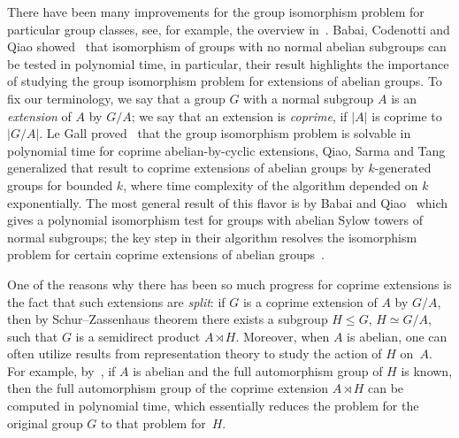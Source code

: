 \documentclass{article}
\begin{document}
There have been many improvements for the group isomorphism problem for particular group classes, see, for example, the overview in~\cite{grochow}.
Babai, Codenotti and Qiao showed~\cite{trivrad} that isomorphism of groups with no normal abelian subgroups can be tested in polynomial time,
in particular, their result highlights the importance of studying the group isomorphism problem for extensions of abelian groups.
To fix our terminology, we say that a group \( G \) with a normal subgroup \( A \) is an \emph{extension} of \( A \) by \( G/A \);
we say that an extension is \emph{coprime}, if \( |A| \) is coprime to \( |G/A| \).
Le Gall proved~\cite{legall} that the group isomorphism problem is solvable in polynomial time for coprime abelian-by-cyclic extensions,
Qiao, Sarma and Tang~\cite{qiao} generalized that result to coprime extensions of abelian groups by \( k \)-generated groups for bounded \( k \),
where time complexity of the algorithm depended on \( k \) exponentially. The most general result of this flavor is by Babai and Qiao~\cite{absyl}
which gives a polynomial isomorphism test for groups with abelian Sylow towers of normal subgroups; the key step in their algorithm
resolves the isomorphism problem for certain coprime extensions of abelian groups~\cite[Theorem~1.2]{absyl}.

One of the reasons why there has been so much progress for coprime extensions is the fact that such extensions are \emph{split}:
if \( G \) is a coprime extension of \( A \) by \( G/A \), then by Schur--Zassenhaus theorem there exists a subgroup \( H \leq G \), \( H \simeq G/A \),
such that \( G \) is a semidirect product \( A \rtimes H \). Moreover, when \( A \) is abelian, one can often utilize results from representation theory
to study the action of \( H \) on~\( A \). For example, by~\cite[Theorem~1.2]{absyl}, if \( A \) is abelian and the full automorphism group of \( H \) is known,
then the full automorphism group of the coprime extension \( A \rtimes H \) can be computed in polynomial time, which essentially reduces
the problem for the original group \( G \) to that problem for~\( H \).
\end{document}
